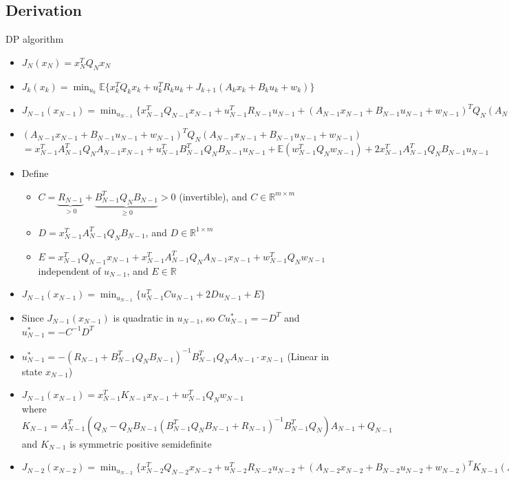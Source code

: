 \subsection{Derivation}
DP algorithm
\begin{itemize}
    \item $J_N(x_N)=x_N^TQ_Nx_N$
    \item $J_k(x_k)=\min_{u_k}\mathbb{E}\{ x_k^TQ_kx_k + u_k^TR_ku_k + J_{k+1}(A_kx_k+B_ku_k+w_k) \}$
    \item $J_{N-1}(x_{N-1})=\min_{u_{N-1}} \{ x_{N-1}^TQ_{N-1}x_{N-1} + u_{N-1}^TR_{N-1}u_{N-1} + (A_{N-1}x_{N-1}+B_{N-1}u_{N-1}+w_{N-1})^TQ_N(A_{N-1}x_{N-1}+B_{N-1}u_{N-1}+w_{N-1}) \}$
    \item $(A_{N-1}x_{N-1}+B_{N-1}u_{N-1}+w_{N-1})^TQ_N(A_{N-1}x_{N-1}+B_{N-1}u_{N-1}+w_{N-1})$ \\
    $ = x_{N-1}^TA_{N-1}^TQ_NA_{N-1}x_{N-1} + u_{N-1}^TB_{N-1}^TQ_NB_{N-1}u_{N-1} + \mathbb{E}(w_{N-1}^TQ_Nw_{N-1}) + 2x_{N-1}^TA_{N-1}^TQ_NB_{N-1}u_{N-1}$ \\
    \item Define
    \begin{itemize}
        \item $C = \underbrace{R_{N-1}}_{>0} + \underbrace{B_{N-1}^T Q_N B_{N-1}}_{\geq 0} >0$ (invertible), and $C\in\mathbb{R}^{m\times m}$
        \item $D = x_{N-1}^TA_{N-1}^TQ_N B_{N-1}$, and $D\in\mathbb{R}^{1\times m}$
        \item $E = x_{N-1}^TQ_{N-1}x_{N-1} + x_{N-1}^TA_{N-1}^TQ_NA_{N-1}x_{N-1} + w_{N-1}^TQ_Nw_{N-1}$ independent of $u_{N-1}$, and $E\in\mathbb{R}$
    \end{itemize}
    \item $J_{N-1}(x_{N-1})=\min_{u_{N-1}} \{ u_{N-1}^T C u_{N-1} + 2Du_{N-1} + E\} $
    \item Since $J_{N-1}(x_{N-1})$ is quadratic in $u_{N-1}$, so $Cu_{N-1}^*=-D^T$ and $u_{N-1}^*=-C^{-1}D^T$
    \item $u_{N-1}^* = -(R_{N-1}+B_{N-1}^T Q_N B_{N-1})^{-1} B_{N-1}^T Q_N A_{N-1} \cdot x_{N-1}$ (Linear in state $x_{N-1}$)
    \item $J_{N-1}(x_{N-1}) = x_{N-1}^TK_{N-1}x_{N-1} + w_{N-1}^TQ_Nw_{N-1}$ \\
    where $K_{N-1}=A_{N-1}^T(Q_N-Q_NB_{N-1}(B_{N-1}^TQ_NB_{N-1}+R_{N-1})^{-1}B_{N-1}^TQ_N)A_{N-1}+Q_{N-1}$ \\
    and $K_{N-1}$ is symmetric positive semidefinite
    \item $J_{N-2}(x_{N-2})=\min_{u_{N-2}} \{ x_{N-2}^TQ_{N-2}x_{N-2} + u_{N-2}^TR_{N-2}u_{N-2} + (A_{N-2}x_{N-2}+B_{N-2}u_{N-2}+w_{N-2})^TK_{N-1}(A_{N-2}x_{N-2}+B_{N-2}u_{N-2}+w_{N-2}) \}$
\end{itemize}

